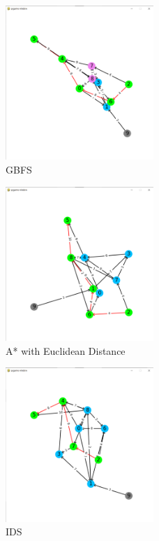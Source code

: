 \begin{figure}[h!]
    \centering
    \includegraphics[width=0.5\textwidth]{result/testcase3/greedy.png}
    \caption{GBFS}
\end{figure}
\begin{figure}[h!]
    \centering
    \includegraphics[width=0.5\textwidth]{result/testcase3/astar.png}
    \caption{A* with Euclidean Distance}
\end{figure}
\begin{figure}[h!]
    \centering
    \includegraphics[width=0.5\textwidth]{result/testcase3/ids.png}
    \caption{IDS}
\end{figure}
